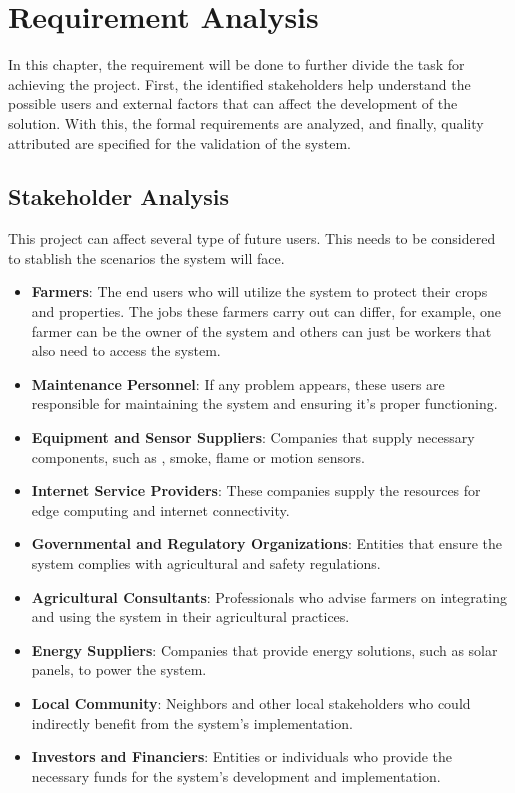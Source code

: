 \section{Requirement Analysis}

In this chapter, the requirement will be done to further divide the task for achieving the project. First, the identified 
stakeholders help understand the possible users and external factors that can affect the development of the solution. With this, 
the formal requirements are analyzed, and finally, quality attributed are specified for the validation of the system.

\subsection{Stakeholder Analysis}

This project can affect several type of future users. This needs to be considered to stablish the scenarios the system will face. 

\begin{itemize}
    \item \textbf{Farmers}: The end users who will utilize the system to protect their crops and properties. The jobs these farmers carry out can differ, for example, one farmer can be the owner of the system 
    and others can just be workers that also need to access the system.
    \item \textbf{Maintenance Personnel}: If any problem appears, these users are responsible for maintaining the system and ensuring it's proper functioning.
    \item \textbf{Equipment and Sensor Suppliers}: Companies that supply necessary components, such as , smoke, flame or motion sensors.
    \item \textbf{Internet Service Providers}: These companies supply the resources for edge computing and internet connectivity.
    \item \textbf{Governmental and Regulatory Organizations}: Entities that ensure the system complies with agricultural and safety regulations.
    \item \textbf{Agricultural Consultants}: Professionals who advise farmers on integrating and using the system in their agricultural practices.
    \item \textbf{Energy Suppliers}: Companies that provide energy solutions, such as solar panels, to power the system.
    \item \textbf{Local Community}: Neighbors and other local stakeholders who could indirectly benefit from the system's implementation.
    \item \textbf{Investors and Financiers}: Entities or individuals who provide the necessary funds for the system's development and implementation.
\end{itemize}

